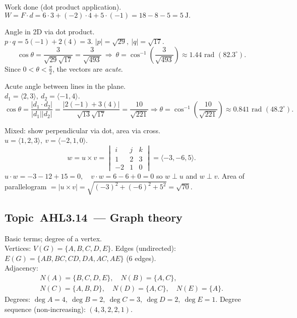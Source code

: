 \documentclass[11pt]{article}
\def\textbf#1{#1}%
\def\mathbf#1{#1}%
\newcommand{\tocsubsection}[1]{\subsection{#1}}
\begin{document}
\begin{solution}
\textbf{Work done (dot product application).}\\
\(W=\mathbf{F}\cdot\mathbf{d}=6\cdot3+(-2)\cdot4+5\cdot(-1)=18-8-5=5\ \text{J}.\)
\end{solution}

\begin{solution}
\textbf{Angle in 2D via dot product.}\\
\(\mathbf{p}\cdot\mathbf{q}=5(-1)+2(4)=3.\)
\(|\mathbf{p}|=\sqrt{29},\ |\mathbf{q}|=\sqrt{17}\).  
\[
\cos\theta=\frac{3}{\sqrt{29}\sqrt{17}}=\frac{3}{\sqrt{493}}
\ \Rightarrow\ 
\theta=\cos^{-1}\!\left(\frac{3}{\sqrt{493}}\right)\approx1.44\text{ rad }(82.3^\circ).
\]
Since \(0<\theta<\tfrac{\pi}{2}\), the vectors are \emph{acute}.
\end{solution}

\begin{solution}
\textbf{Acute angle between lines in the plane.}\\
\(\mathbf{d}_1=\langle2,3\rangle,\ \mathbf{d}_2=\langle-1,4\rangle\).
\[
\cos\theta=\frac{|\mathbf{d}_1\cdot\mathbf{d}_2|}{|\mathbf{d}_1||\mathbf{d}_2|}
=\frac{|2(-1)+3(4)|}{\sqrt{13}\sqrt{17}}
=\frac{10}{\sqrt{221}}
\Rightarrow
\theta=\cos^{-1}\!\left(\frac{10}{\sqrt{221}}\right)\approx0.841\text{ rad }(48.2^\circ).
\]
\end{solution}

\begin{solution}
\textbf{Mixed: show perpendicular via dot, area via cross.}\\
\(\mathbf{u}=\langle1,2,3\rangle,\ \mathbf{v}=\langle-2,1,0\rangle\).
\[
\mathbf{w}=\mathbf{u}\times\mathbf{v}=
\begin{vmatrix}
\mathbf{i}&\mathbf{j}&\mathbf{k}\\[2pt]
1&2&3\\
-2&1&0
\end{vmatrix}
=\langle-3,-6,5\rangle.
\]
\(\mathbf{u}\cdot\mathbf{w}=-3-12+15=0,\quad
\mathbf{v}\cdot\mathbf{w}=6-6+0=0\)  
so \(\mathbf{w}\perp\mathbf{u}\) and \(\mathbf{w}\perp\mathbf{v}\).  
Area of parallelogram \(=|\mathbf{u}\times\mathbf{v}|=\sqrt{(-3)^2+(-6)^2+5^2}=\sqrt{70}.\)
\end{solution}



\tocsubsection{Topic AHL3.14 — Graph theory}


\begin{solution}
\textbf{Basic terms; degree of a vertex.}\\
Vertices: \(V(G)=\{A,B,C,D,E\}\).  
Edges (undirected): \(E(G)=\{AB,BC,CD,DA,AC,AE\}\) (6 edges).\\
Adjacency:
\[
\begin{array}{l}
N(A)=\{B,C,D,E\},\quad
N(B)=\{A,C\},\\
N(C)=\{A,B,D\},\quad
N(D)=\{A,C\},\quad
N(E)=\{A\}.
\end{array}
\]
Degrees: \(\deg A=4,\ \deg B=2,\ \deg C=3,\ \deg D=2,\ \deg E=1\).  
Degree sequence (non-increasing): \((4,3,2,2,1)\).
\end{solution}
\end{document}
